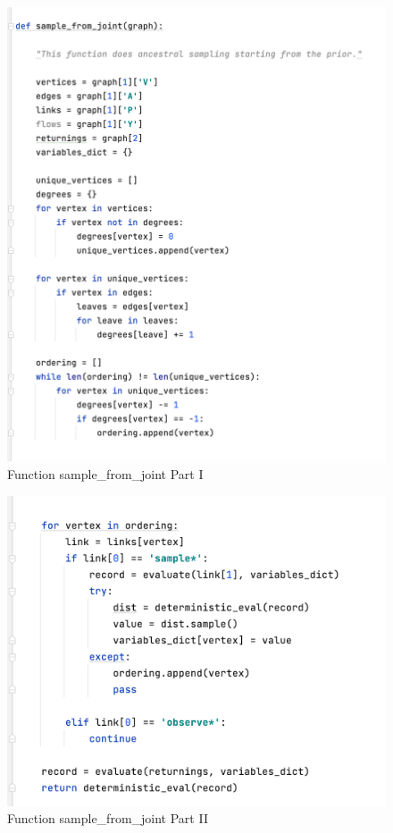 \documentclass{article}
\begin{document}
\begin{enumerate}
\begin{figure}[!htp]
	\centering
	\includegraphics[scale=0.6]{../figs/graph_code2}
	\caption{Function sample_from_joint Part I}
\end{figure}

\begin{figure}[!htp]
	\centering
	\includegraphics[scale=0.6]{../figs/graph_code3}
	\caption{Function sample_from_joint Part II}
\end{figure}


\end{enumerate}
\end{document}
